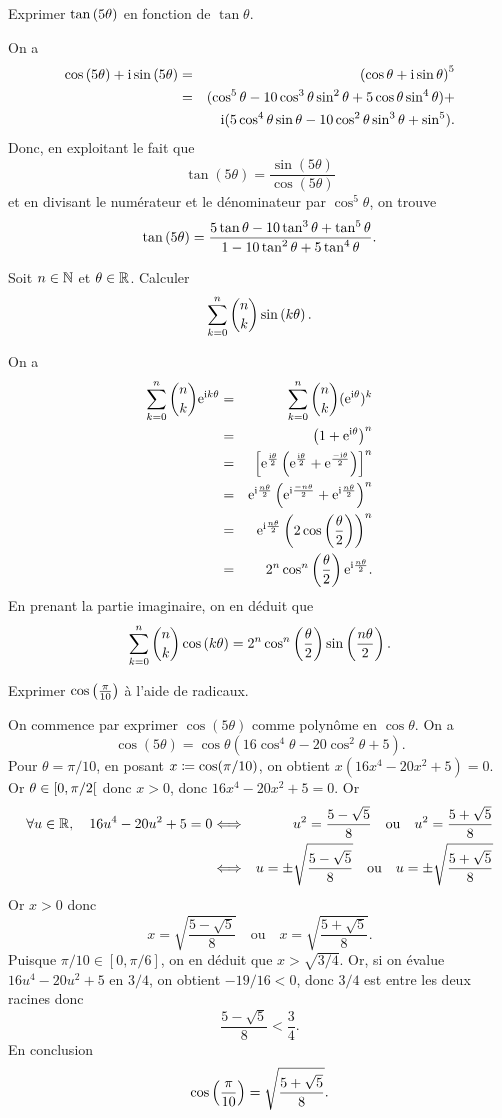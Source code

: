 \documentclass{magnolia}
\begin{document}
\begin{exos}
\exo Exprimer $\tan\left(5\theta\right)$ en fonction de $\tan\theta$.
\begin{sol}
On a
\begin{eqnarray*}
\cos\left(5\theta\right)+{\rm i}\sin\left(5\theta\right)
&=& \left(\cos\theta+{\rm i}\sin\theta\right)^5\\
&=& (\cos^{5}\theta-10\cos^{3}\theta\sin^{2}\theta+5\cos\theta\sin^{4}\theta)+\\
& & {\rm i}(5\cos^{4}\theta\sin\theta-10\cos^{2}\theta\sin^{3}\theta+\sin^{5}).
\end{eqnarray*}
Donc, en exploitant le fait que
\[\tan (5\theta)=\frac{\sin (5\theta)}{\cos (5\theta)}\]
et en divisant le numérateur et le dénominateur par $ \cos^{5}\theta $, on trouve
  \[\tan\p{5\theta}=
    \frac{5\tan\theta-10\tan^3\theta+\tan^5\theta}%
    {1-10\tan^2\theta+5\tan^4\theta}.\]
\end{sol}
\exo Soit $n\in\mathbb{N}$ et $\theta\in\mathbb{R}$. Calculer
  \[\sum_{k=0}^n \binom{n}{k}\sin\left(k\theta\right).\]
  \begin{sol}
  On a
  \begin{eqnarray*}
 \sum_{k=0}^{n}\binom{n}{k}{\rm e}^{{\rm i} k\theta}
 &=& \sum_{k=0}^{n}\binom{n}{k}({\rm e}^{{\rm i}\theta})^k\\
 &=& \left(1+{\rm e}^{{\rm i}\theta}\right)^n\\
 &=& \left[{\rm e}^{\frac{{\rm i}\theta}{2}}\left({\rm e}^{\frac{{\rm i}\theta}{2}}+{\rm e}^{\frac{-{\rm i}\theta}{2}}\right)\right]^n\\
 &=& {\rm e}^{{\rm i}\frac{n\theta}{2}}\left( {\rm e}^{{\rm i}\frac{-n\theta}{2}}+{\rm e}^{{\rm i}\frac{n\theta}{2}}\right)^{n}\\
 &=& {\rm e}^{{\rm i}\frac{n\theta}{2}}\left( 2\cos\left( \frac{\theta}{2}\right) \right) ^{n}\\
 &=& 2^n \cos^n\left(\frac{\theta}{2}\right){\rm e}^{{\rm i}\frac{n\theta}{2}}.
  \end{eqnarray*}
  En prenant la partie imaginaire, on en déduit que
  \[\sum_{k=0}^n \binom{n}{k}\cos\left(k\theta\right)=2^n \cos^n\left(\frac{\theta}{2}\right)\sin\left(\frac{n\theta}{2}\right).\]
  \end{sol}
\exo Exprimer $\cos\left(\frac{\pi}{10}\right)$ à l'aide de radicaux.
\begin{sol}
On commence par exprimer $\cos(5\theta)$ comme polynôme en $\cos\theta$. On a
\[\cos (5\theta)=\cos \theta(16\cos^{4}\theta -20\cos^{2}\theta +5).\]
Pour $\theta=\pi/10$, en posant $x\coloneqq\cos(\pi/10)$, on obtient $x(16x^4-20x^2+5)=0$. Or $\theta\in\left[0,\pi/2\right[$ donc $x>0$, donc $16x^4-20x^2+5=0$. Or
\begin{eqnarray*}
\forall u\in\mathbb{R},\quad 16u^4-20u^2+5=0
&\Longleftrightarrow& u^2=\frac{5-\sqrt{5}}{8} \quad\text{ou}\quad  u^2=\frac{5+\sqrt{5}}{8}\\
&\Longleftrightarrow& u=\pm\sqrt{\frac{5-\sqrt{5}}{8}} \quad\text{ou}\quad  u=\pm\sqrt{\frac{5+\sqrt{5}}{8}}
\end{eqnarray*}
Or $x>0$ donc
\[x=\sqrt{\frac{5-\sqrt{5}}{8}} \quad\text{ou}\quad x=\sqrt{\frac{5+\sqrt{5}}{8}}.\]
Puisque $\pi/10\in[0,\pi/6]$, on en déduit que $x>\sqrt{3/4}$. Or, si on évalue $16u^4-20u^2+5$ en $3/4$, on obtient $-19/16<0$, donc $3/4$ est entre les deux racines donc
\[\frac{5-\sqrt{5}}{8}<\frac{3}{4}.\]
En conclusion
\[\cos\left(\frac{\pi}{10}\right)=\sqrt{\frac{5+\sqrt{5}}{8}}.\]
\end{sol}
\end{exos}
\end{document}
